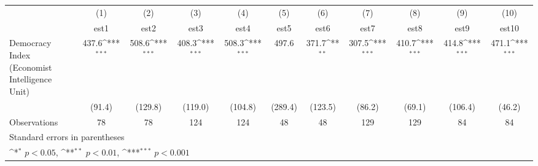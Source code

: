 {
\def\sym#1{\ifmmode^{#1}\else\(^{#1}\)\fi}
\begin{tabular}{l*{10}{c}}
\hline\hline
                    &\multicolumn{1}{c}{(1)}         &\multicolumn{1}{c}{(2)}         &\multicolumn{1}{c}{(3)}         &\multicolumn{1}{c}{(4)}         &\multicolumn{1}{c}{(5)}         &\multicolumn{1}{c}{(6)}         &\multicolumn{1}{c}{(7)}         &\multicolumn{1}{c}{(8)}         &\multicolumn{1}{c}{(9)}         &\multicolumn{1}{c}{(10)}         \\
                    &        est1         &        est2         &        est3         &        est4         &        est5         &        est6         &        est7         &        est8         &        est9         &       est10         \\
\hline
Democracy Index (Economist Intelligence Unit)&       437.6\sym{***}&       508.6\sym{***}&       408.3\sym{***}&       508.3\sym{***}&       497.6         &       371.7\sym{**} &       307.5\sym{***}&       410.7\sym{***}&       414.8\sym{***}&       471.1\sym{***}\\
                    &      (91.4)         &     (129.8)         &     (119.0)         &     (104.8)         &     (289.4)         &     (123.5)         &      (86.2)         &      (69.1)         &     (106.4)         &      (46.2)         \\
\hline
Observations        &          78         &          78         &         124         &         124         &          48         &          48         &         129         &         129         &          84         &          84         \\
\hline\hline
\multicolumn{11}{l}{\footnotesize Standard errors in parentheses}\\
\multicolumn{11}{l}{\footnotesize \sym{*} \(p<0.05\), \sym{**} \(p<0.01\), \sym{***} \(p<0.001\)}\\
\end{tabular}
}
